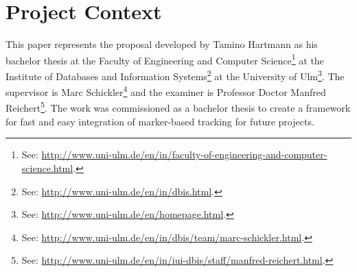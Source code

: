 \section{Project Context}

This paper represents the proposal developed by Tamino Hartmann as his bachelor thesis at the Faculty of Engineering and Computer Science\footnote{See: \url{http://www.uni-ulm.de/en/in/faculty-of-engineering-and-computer-science.html}.} at the Institute of Databases and Information Systems\footnote{See: \url{http://www.uni-ulm.de/en/in/dbis.html}.} at the University of Ulm\footnote{See: \url{http://www.uni-ulm.de/en/homepage.html}.}.
The supervisor is Marc Schickler\footnote{See: \url{http://www.uni-ulm.de/en/in/dbis/team/marc-schickler.html}.} and the examiner is Professor Doctor Manfred Reichert\footnote{See: \url{http://www.uni-ulm.de/en/in/iui-dbis/staff/manfred-reichert.html}.}.
The work was commissioned as a bachelor thesis to create a framework for fast and easy integration of marker-based tracking for future projects.
